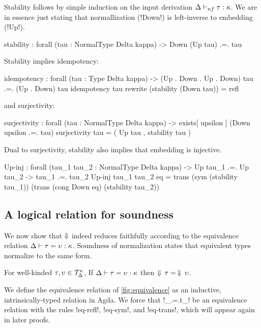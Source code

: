 \documentclass[sigplan,10pt,anonymous,review]{acmart}\settopmatter{printfolios=true,printccs=false,printacmref=false}
\begin{document}
Stability follows by simple induction on the input derivation $\Delta \vdash_{nf} \tau : \kappa$. We are in essence just stating that normallization (!Down!) is left-inverse to embedding (!Up!).

\begin{agda}
stability : forall (tau : NormalType Delta kappa) -> Down (Up tau) .=. tau
\end{agda}
Stability implies idempotency:
\begin{agda}
idempotency : forall (tau : Type Delta kappa) -> 
              (Up . Down . Up . Down) tau .=. (Up . Down) tau
idempotency tau rewrite (stability (Down tau)) = refl
\end{agda}
\Ni and surjectivity: 

\begin{agda}
surjectivity : forall (tau : NormalType Delta kappa) -> 
               exists[ upsilon ] (Down upsilon .=. tau)
surjectivity tau = ( Up tau , stability tau )
\end{agda}

Dual to surjectivity, stability also implies that embedding is injective.

\begin{agda}
Up-inj : forall (tau_1  tau_2 : NormalType Delta kappa) -> 
         Up tau_1 .=. Up tau_2 -> tau_1 .=. tau_2
Up-inj  tau_1  tau_2  eq = 
  trans 
    (sym (stability tau_1))          
    (trans 
      (cong Down eq)
      (stability tau_2))
\end{agda}

\subsection{A logical relation for soundness}

We now show that $\Downarrow$ indeed reduces faithfully according to the equivalence relation $\Delta \vdash \tau = \upsilon : \kappa$. Soundness of normalization states that equivalent types normalize to the same form.

\ifthms
\begin{theorem}[Soundness]
For well-kinded $\tau , \upsilon \in {\mathcal T}_{\Delta}^{\kappa}$, If $\Delta \vdash \tau = \upsilon : \kappa$ then $\Downarrow\, \tau = \, \Downarrow \, \upsilon$.
\end{theorem}
\fi

We define the equivalence relation of \cref{fig:equivalence} as an inductive, intrinsically-typed relation in Agda. We force that !_.=.t_! be an equivalence relation with the rules !eq-refl!, !eq-sym!, and !eq-trans!, which will appear again in later proofs. 
\end{document}
